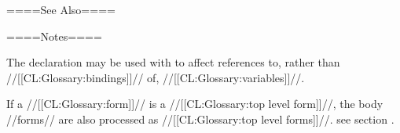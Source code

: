 ====See Also====


====Notes====

The  declaration may be used with  to affect references to, rather than //[[CL:Glossary:bindings]]// of, //[[CL:Glossary:variables]]//.

If a  //[[CL:Glossary:form]]// is a //[[CL:Glossary:top level form]]//, the body //forms// are also processed as //[[CL:Glossary:top level forms]]//. see section {\secref\FileCompilation}.

    
